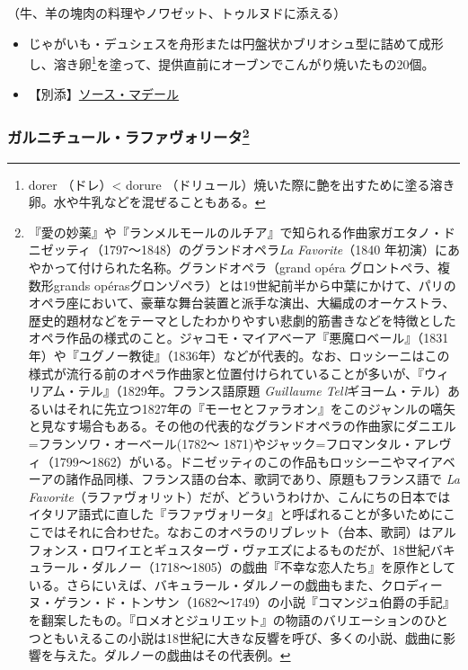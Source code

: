 \begin{recette}
（牛、羊の塊肉の料理やノワゼット、トゥルヌドに添える）

\begin{itemize}
\item
  じゃがいも・デュシェスを舟形または円盤状かブリオシュ型に詰めて成形し、溶き卵\footnote{dorer
    （ドレ）\textless{} dorure
    （ドリュール）焼いた際に艶を出すために塗る溶き卵。水や牛乳などを混ぜることもある。}を塗って、提供直前にオーブンでこんがり焼いたもの20個。
\item
  【別添】\protect\hyperlink{sauce-madere}{ソース・マデール}
\end{itemize}

\atoaki{}

\hypertarget{garniture-favorite}{%
\subsubsection[ガルニチュール・ラファヴォリータ]{\texorpdfstring{ガルニチュール・ラファヴォリータ\footnote{『愛の妙薬』や『ランメルモールのルチア』で知られる作曲家ガエタノ・ドニゼッティ（1797〜1848）のグランドオペラ\emph{La
  Favorite}（1840
  年初演）にあやかって付けられた名称。グランドオペラ（grand opéra
  グロントペラ、複数形grands
  opérasグロンゾペラ）とは19世紀前半から中葉にかけて、パリのオペラ座において、豪華な舞台装置と派手な演出、大編成のオーケストラ、歴史的題材などをテーマとしたわかりやすい悲劇的筋書きなどを特徴としたオペラ作品の様式のこと。ジャコモ・マイアベーア『悪魔ロベール』（1831年）や『ユグノー教徒』（1836年）などが代表的。なお、ロッシーニはこの様式が流行る前のオペラ作曲家と位置付けられていることが多いが、『ウィリアム・テル』（1829年。フランス語原題
  \emph{Guillaume
  Tell}ギヨーム・テル）あるいはそれに先立つ1827年の『モーセとファラオン』をこのジャンルの嚆矢と見なす場合もある。その他の代表的なグランドオペラの作曲家にダニエル=フランソワ・オーベール(1782〜
  1871)やジャック=フロマンタル・アレヴィ（1799〜1862）がいる。ドニゼッティのこの作品もロッシーニやマイアベーアの諸作品同様、フランス語の台本、歌詞であり、原題もフランス語で
  \emph{La
  Favorite}（ラファヴォリット）だが、どういうわけか、こんにちの日本ではイタリア語式に直した『ラファヴォリータ』と呼ばれることが多いためにここではそれに合わせた。なおこのオペラのリブレット（台本、歌詞）はアルフォンス・ロワイエとギュスターヴ・ヴァエズによるものだが、18世紀バキュラール・ダルノー（1718〜1805）の戯曲『不幸な恋人たち』を原作としている。さらにいえば、バキュラール・ダルノーの戯曲もまた、クロディーヌ・ゲラン・ド・トンサン（1682〜1749）の小説『コマンジュ伯爵の手記』を翻案したもの。『ロメオとジュリエット』の物語のバリエーションのひとつともいえるこの小説は18世紀に大きな反響を呼び、多くの小説、戯曲に影響を与えた。ダルノーの戯曲はその代表例。}}{ガルニチュール・ラファヴォリータ}}\label{garniture-favorite}}


\end{recette}
